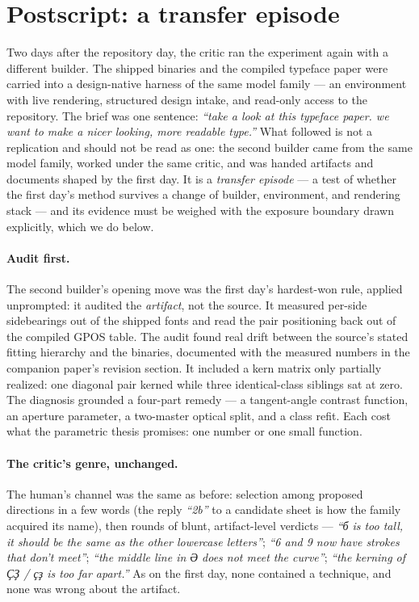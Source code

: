 \documentclass[11pt]{article}
\newcommand{\cz}[1]{{\chu #1}}
\begin{document}
\section{Postscript: a transfer episode}\label{sec:second}

Two days after the repository day, the critic ran the experiment again with a different builder. The shipped binaries and the compiled typeface paper were carried into a design-native harness of the same model family — an environment with live rendering, structured design intake, and read-only access to the repository. The brief was one sentence: \emph{``take a look at this typeface paper. we want to make a nicer looking, more readable type.''} What followed is not a replication and should not be read as one: the second builder came from the same model family, worked under the same critic, and was handed artifacts and documents shaped by the first day. It is a \emph{transfer episode} — a test of whether the first day's method survives a change of builder, environment, and rendering stack — and its evidence must be weighed with the exposure boundary drawn explicitly, which we do below.

\paragraph{Audit first.} The second builder's opening move was the first day's hardest-won rule, applied unprompted: it audited the \emph{artifact}, not the source. It measured per-side sidebearings out of the shipped fonts and read the pair positioning back out of the compiled GPOS table. The audit found real drift between the source's stated fitting hierarchy and the binaries, documented with the measured numbers in the companion paper's revision section. It included a kern matrix only partially realized: one diagonal pair kerned while three identical-class siblings sat at zero. The diagnosis grounded a four-part remedy — a tangent-angle contrast function, an aperture parameter, a two-master optical split, and a class refit. Each cost what the parametric thesis promises: one number or one small function.

\paragraph{The critic's genre, unchanged.} The human's channel was the same as before: selection among proposed directions in a few words (the reply \emph{``2b''} to a candidate sheet is how the family acquired its name), then rounds of blunt, artifact-level verdicts — \emph{``б is too tall, it should be the same as the other lowercase letters''}; \emph{``6 and 9 now have strokes that don't meet''}; \emph{``the middle line in \cz{Ә} does not meet the curve''}; \emph{``the kerning of \cz{ҪҘ} / \cz{ҫҙ} is too far apart.''} As on the first day, none contained a technique, and none was wrong about the artifact.
\end{document}
